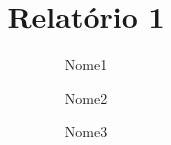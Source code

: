 \documentclass[report]{zentera}
\title{Relatório 1}
\author{Nome1 \RA{XXXXXX} \and Nome2 \RA{XXXXXX} \and Nome3 \RA{XXXXXX}}
\begin{document}
\makeheader
\end{document}
